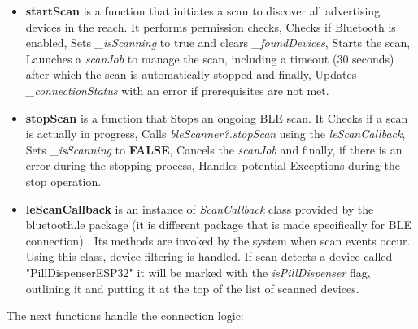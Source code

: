\begin{itemize}
	\item \textbf{startScan} is a function that initiates a scan to discover all advertising devices in the reach. It performs permission checks,  Checks if Bluetooth is enabled, Sets \textit{\_isScanning} to true and clears \textit{\_foundDevices}, Starts the scan, Launches a \textit{scanJob} to manage the scan, including a timeout (30 seconds) after which the scan is automatically stopped and finally, Updates \textit{\_connectionStatus} with an error if prerequisites are not met.
	\item \textbf{stopScan} is a function that Stops an ongoing BLE scan. It Checks if a scan is actually in progress, Calls \textit{bleScanner?.stopScan} using the \textit{leScanCallback}, Sets \textit{\_isScanning} to \textbf{FALSE}, Cancels the \textit{scanJob} and finally, if there is an error during the stopping process, Handles potential Exceptions during the stop operation. 
	\item \textbf{leScanCallback} is an instance of \textit{ScanCallback} class provided by the bluetooth.le package (it is different package that is made specifically for \ac{BLE} connection) \cite{android_bluetooth_le}. Its methods are invoked by the system when scan events occur. Using this class, device filtering is handled. If scan detects a device called "PillDispenserESP32" it will be marked with the \textit{isPillDispenser} flag, outlining it and putting it at the top of the list of scanned devices.
\end{itemize}
The next functions handle the connection logic:
